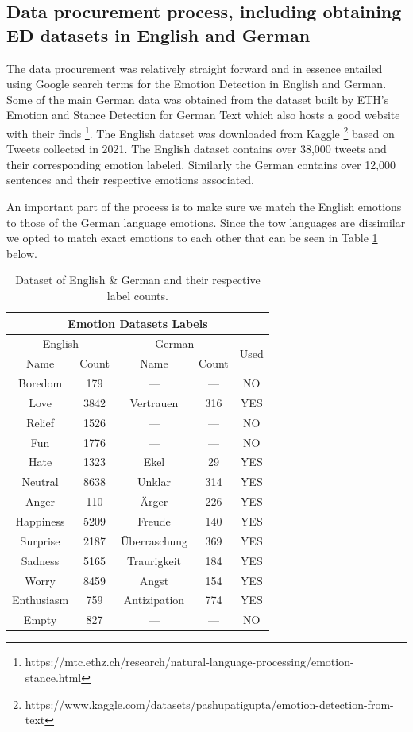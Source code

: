 \documentclass[11pt]{article}
\begin{document}
\subsection{Data procurement process, including obtaining ED datasets in English and German}
The data procurement was relatively straight forward and in essence entailed using Google search terms for the Emotion Detection in English and German. Some of the main German data was obtained from the dataset built by ETH's Emotion and Stance Detection for German Text \cite{mascarell-etal-2021-stance} which also hosts a good website with their finds \footnote{https://mtc.ethz.ch/research/natural-language-processing/emotion-stance.html}. The English dataset was downloaded from Kaggle \footnote{https://www.kaggle.com/datasets/pashupatigupta/emotion-detection-from-text} based on Tweets collected in 2021. The English dataset contains over 38,000 tweets and their corresponding emotion labeled. Similarly the German contains over 12,000 sentences and their respective emotions associated.

An important part of the process is to make sure we match the English emotions to those of the German language emotions. Since the tow languages are dissimilar we opted to match exact emotions to each other that can be seen in Table \ref{table:dataset_labels} below.

\begin{table}[h!]
\centering
\begin{tabular}{ | c c | c c | c | }
    \hline
    \multicolumn{5}{|c|}{Emotion Datasets Labels} \\
    
    \hline
    \multicolumn{2}{|c|}{English} & \multicolumn{2}{|c|}{German} & \multirow{2}{*}{Used} \\
    Name & Count & Name & Count \\
    \hline
    Boredom    &  179 & ---           & --- & NO  \\
    Love       & 3842 & Vertrauen     & 316 & YES \\
    Relief     & 1526 & ---           & --- & NO  \\ 
    Fun        & 1776 & ---           & --- & NO  \\
    Hate       & 1323 & Ekel          &  29 & YES \\
    Neutral    & 8638 & Unklar        & 314 & YES \\
    Anger      &  110 & Ärger         & 226 & YES \\
    Happiness  & 5209 & Freude        & 140 & YES \\
    Surprise   & 2187 & Überraschung  & 369 & YES \\
    Sadness    & 5165 & Traurigkeit   & 184 & YES \\
    Worry      & 8459 & Angst         & 154 & YES \\
    Enthusiasm &  759 & Antizipation  & 774 & YES \\
    Empty      &  827 & ---           & --- & NO  \\
    \hline
\end{tabular}
\caption{Dataset of English \& German and their respective label counts.}
\label{table:dataset_labels}
\end{table}
\end{document}
